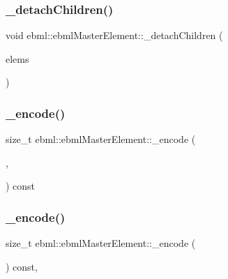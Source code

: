 \subsubsection{\texorpdfstring{\+\_\+detach\+Children()}{\_detachChildren()}}
{\footnotesize\ttfamily void ebml\+::ebml\+Master\+Element\+::\+\_\+detach\+Children (\begin{DoxyParamCaption}\item[{const \mbox{\hyperlink{namespaceebml_a1ddadd26791f273d851882653b9caf70}{ebml\+Element\+\_\+l}} \&}]{elems }\end{DoxyParamCaption})\hspace{0.3cm}{\ttfamily [protected]}}

\mbox{\label{classebml_1_1ebmlMasterElement_ab50b9cdd8e402150cd96a19d613c98f5}} 
\subsubsection{\texorpdfstring{\+\_\+encode()}{\_encode()}\hspace{0.1cm}{\footnotesize\ttfamily [1/2]}}
{\footnotesize\ttfamily size\+\_\+t ebml\+::ebml\+Master\+Element\+::\+\_\+encode (\begin{DoxyParamCaption}\item[{char $\ast$}]{,  }\item[{const \mbox{\hyperlink{structebml_1_1sizetree__t}{sizetree\+\_\+t}} \&}]{ }\end{DoxyParamCaption}) const\hspace{0.3cm}{\ttfamily [protected]}}

\mbox{\label{classebml_1_1ebmlMasterElement_aa0dd7215a5de90f8a52364df781952e2}} 
\subsubsection{\texorpdfstring{\+\_\+encode()}{\_encode()}\hspace{0.1cm}{\footnotesize\ttfamily [2/2]}}
{\footnotesize\ttfamily size\+\_\+t ebml\+::ebml\+Master\+Element\+::\+\_\+encode (\begin{DoxyParamCaption}\item[{char $\ast$}]{ }\end{DoxyParamCaption}) const\hspace{0.3cm}{\ttfamily [protected]}, {\ttfamily [virtual]}}




